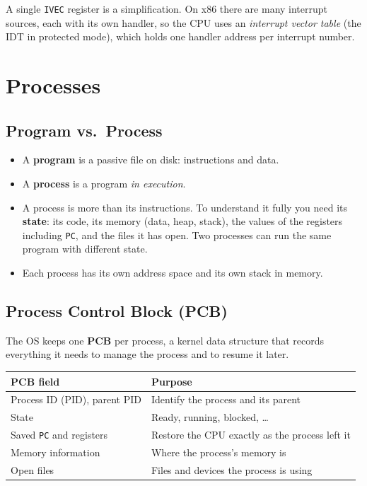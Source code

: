 \documentclass{article}
\newcommand{\reg}[1]{\texttt{#1}}
\begin{document}
\begin{extra}
	A single \reg{IVEC} register is a simplification. On x86 there are many interrupt sources, each with its own handler, so the CPU uses an \emph{interrupt vector table} (the IDT in protected mode), which holds one handler address per interrupt number.
\end{extra}

\section{Processes}
\label{sec:processes}

\subsection{Program vs.\ Process}
\begin{itemize}
	\item A \textbf{program} is a passive file on disk: instructions and data.
	\item A \textbf{process} is a program \emph{in execution}.
	\item A process is more than its instructions. To understand it fully you need its \textbf{state}: its code, its memory (data, heap, stack), the values of the registers including \reg{PC}, and the files it has open. Two processes can run the same program with different state.
	\item Each process has its own address space and its own stack in memory.
\end{itemize}

\subsection{Process Control Block (PCB)}
The OS keeps one \textbf{PCB} per process, a kernel data structure that records everything it needs to manage the process and to resume it later.

\begin{table}[H]
	\centering
	\begin{tabular}{ll}
		\toprule
		\textbf{PCB field} & \textbf{Purpose} \\
		\midrule
		Process ID (PID), parent PID & Identify the process and its parent \\
		State & Ready, running, blocked, \dots \\
		Saved \reg{PC} and registers & Restore the CPU exactly as the process left it \\
		Memory information & Where the process's memory is \\
		Open files & Files and devices the process is using \\
		\bottomrule
	\end{tabular}
\end{table}
\end{document}
